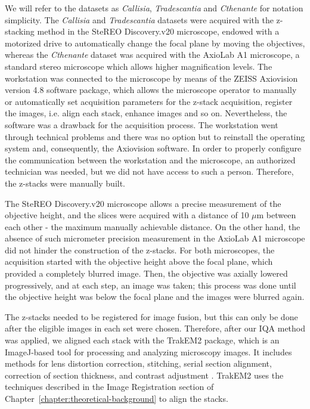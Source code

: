 We will refer to the datasets as \textit{Callisia}, \textit{Tradescantia} and \textit{Cthenante} for notation simplicity. The \textit{Callisia} and \textit{Tradescantia} datasets were acquired with the z-stacking method in the SteREO Discovery.v20 microscope, endowed with a motorized drive to automatically change the focal plane by moving the objectives, whereas the \textit{Cthenante} dataset was acquired with the AxioLab A1 microscope, a standard stereo microscope which allows higher magnification levels. The workstation was connected to the microscope by means of the ZEISS Axiovision version 4.8 software package, which allows the microscope operator to manually or automatically set acquisition parameters for the z-stack acquisition, register the images, i.e. align each stack, enhance images and so on. Nevertheless, the software was a drawback for the acquisition process. The workstation went through technical problems and there was no option but to reinstall the operating system and, consequently, the Axiovision software. In order to properly configure the communication between the workstation and the microscope, an authorized technician was needed, but we did not have access to such a person. Therefore, the z-stacks were manually built.

The SteREO Discovery.v20 microscope allows a precise measurement of the objective height, and the slices were acquired with a distance of 10 $\mu$m between each other - the maximum manually achievable distance. On the other hand, the absence of such micrometer precision measurement in the AxioLab A1 microscope did not hinder the construction of the z-stacks. For both microscopes, the acquisition started with the objective height above the focal plane, which provided a completely blurred image. Then, the objective was axially lowered progressively, and at each step, an image was taken; this process was done until the objective height was below the focal plane and the images were blurred again.

The z-stacks needed to be registered for image fusion, but this can only be done after the eligible images in each set were chosen. Therefore, after our IQA method was applied, we aligned each stack with the TrakEM2 package, which is an ImageJ-based tool for processing and analyzing microscopy images. It includes methods for lens distortion correction, stitching, serial section alignment, correction of section thickness, and contrast adjustment \cite{saalfeld2019computational}. TrakEM2 uses the techniques described in the Image Registration section of Chapter~\ref{chapter:theoretical-background} to align the stacks.

